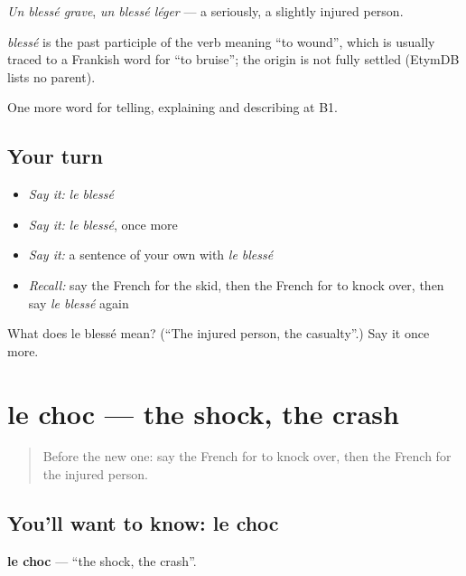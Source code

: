 \emph{Un blessé grave}, \emph{un blessé léger} — a seriously, a slightly injured person.

\begin{cousinweb}
\emph{blessé} is the past participle of the verb meaning \textquotedblleft{}to wound\textquotedblright{}, which is usually traced to a Frankish word for \textquotedblleft{}to bruise\textquotedblright{}; the origin is not fully settled (EtymDB lists no parent).
\end{cousinweb}

\begin{grammarlens}[title={What you've built}]
One more word for telling, explaining and describing at B1.
\end{grammarlens}

\subsection*{Your turn}
\begin{itemize}
\raggedright
  \item \emph{Say it:} \emph{le blessé}
  \item \emph{Say it:} \emph{le blessé}, once more
  \item \emph{Say it:} a sentence of your own with \emph{le blessé}
  \item \emph{Recall:} say the French for the skid, then the French for to knock over, then say \emph{le blessé} again
\end{itemize}

\begin{tcolorbox}[breakable,colback=teal!4,colframe=teal!35!black,title={Before you move on}]
What does le blessé mean? (\textquotedblleft{}The injured person, the casualty\textquotedblright{}.) Say it once more.
\end{tcolorbox}
\section[le choc]{le choc — the shock, the crash}

\label{lesson:FR-C298-choc}



\begin{quote}
Before the new one: say the French for to knock over, then the French for the injured person.
\end{quote}

\subsection*{You'll want to know: le choc}
\textbf{le choc} — \textquotedblleft{}the shock, the crash\textquotedblright{}.

